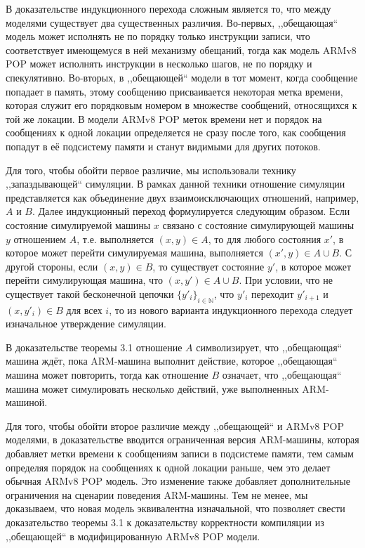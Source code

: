 В доказательстве индукционного перехода сложным является то, что между моделями существует два существенных различия.
Во-первых, ,,обещающая`` модель может исполнять не по порядку только инструкции записи, что соответствует имеющемуся в ней механизму обещаний,
тогда как модель ARMv8 POP может исполнять инструкции в несколько шагов, не по порядку и спекулятивно.
Во-вторых, в ,,обещающей`` модели в тот момент, когда сообщение попадает в память, этому сообщению присваивается некоторая
метка времени, которая служит его порядковым номером в множестве сообщений, относящихся к той же локации. В модели ARMv8 POP
меток времени нет и порядок на сообщениях к одной локации определяется не сразу после того, как
сообщения попадут в её подсистему памяти и станут видимыми для других потоков.

Для того, чтобы обойти первое различие, мы использовали технику ,,запаздывающей`` симуляции. В рамках данной техники отношение
симуляции представляется как объединение двух взаимоисключающих отношений, например, $A$ и $B$. Далее индукционный
переход формулируется следующим образом. Если состояние симулируемой машины $x$ связано с состояние симулирующей машины $y$ отношением $A$,
т.е. выполняется $(x,y) \in A$, то для любого состояния $x'$, в которое может перейти симулируемая машина, выполняется $(x', y) \in A \cup B$.
С другой стороны, если $(x, y) \in B$, то существует состояние $y'$, в которое может перейти симулирующая машина, что $(x, y') \in A \cup B$.
При условии, что не существует такой бесконечной цепочки $\{y'_i\}_{i \in \mathbb{N}}$, что $y'_i$ переходит $y'_{i+1}$ и $(x, y'_i) \in B$ для всех $i$,
то из нового варианта индукционного перехода следует изначальное утверждение симуляции.

В доказательстве теоремы 3.1 отношение $A$ символизирует, что ,,обещающая`` машина ждёт, пока ARM-машина выполнит действие, которое ,,обещающая``
машина может повторить, тогда как отношение $B$ означает, что ,,обещающая`` машина может симулировать несколько действий, уже выполненных ARM-машиной.

Для того, чтобы обойти второе различие между ,,обещающей`` и ARMv8 POP моделями, в доказательстве вводится ограниченная версия ARM-машины,
которая добавляет метки времени к сообщениям записи в подсистеме памяти, тем самым определяя порядок на сообщениях к одной локации
раньше, чем это делает обычная ARMv8 POP модель. Это изменение также добавляет дополнительные ограничения на сценарии поведения ARM-машины.
Тем не менее, мы доказываем, что новая модель эквивалентна изначальной, что позволяет свести доказательство теоремы 3.1
к доказательству корректности компиляции из ,,обещающей`` в модифицированную ARMv8 POP модели.

